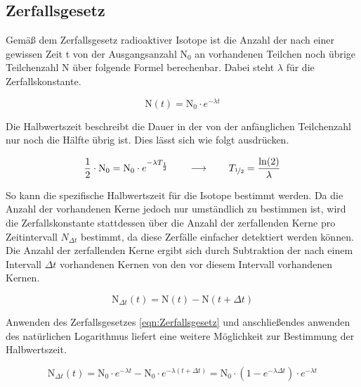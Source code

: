 \documentclass[titlepage = firstcover]{scrartcl}
\begin{document}
        \subsection{Zerfallsgesetz}
            Gemäß dem Zerfallsgesetz radioaktiver Isotope ist die Anzahl der nach einer gewissen Zeit t von der Ausgangsanzahl $\text{N}_0$ an vorhandenen Teilchen noch übrige Teilchenzahl N
            über folgende Formel berechenbar. Dabei steht $\lambda$ für die Zerfallskonstante.
            
            \begin{equation}
                \text{N}(t) = \text{N}_0 \cdot e^{-\lambda t}
                \label{eqn:Zerfallsgesetz}
            \end{equation}

            \noindent
            Die Halbwertszeit beschreibt die Dauer in der von der anfänglichen Teilchenzahl nur noch die Hälfte übrig ist. Dies lässt sich wie folgt ausdrücken.

            \begin{equation}
                \frac{1}{2} \cdot \text{N}_0 = \text{N}_0 \cdot e^{-\lambda T_{\frac{1}{2}}} \qquad \longrightarrow \qquad T_{\nicefrac{1}{2}} = \frac{\ln(2)}{\lambda}
                \label{eqn:Halbwertszeit}
            \end{equation}

            \noindent
            So kann die spezifische Halbwertszeit für die Isotope bestimmt werden.
            Da die Anzahl der vorhandenen Kerne jedoch nur umständlich zu bestimmen ist, wird die Zerfallskonstante stattdessen über die Anzahl der zerfallenden Kerne pro Zeitintervall $N_{\Delta t}$
            bestimmt, da diese Zerfälle einfacher detektiert werden können. Die Anzahl der zerfallenden Kerne ergibt sich durch Subtraktion der nach einem Intervall $\Delta t$ vorhandenen Kernen von
            den vor diesem Intervall vorhandenen Kernen.

            \begin{equation*}
                \text{N}_{\Delta t}(t) = \text{N}(t) - \text{N}(t + \Delta t)
            \end{equation*}

            \noindent
            Anwenden des Zerfallsgesetzes \ref{eqn:Zerfallsgesetz} und anschließendes anwenden des natürlichen Logarithmus liefert eine weitere Möglichkeit zur Bestimmung der Halbwertszeit.
            
            \begin{equation}
                \text{N}_{\Delta t}(t) = \text{N}_0 \cdot e^{-\lambda t} - \text{N}_0 \cdot e^{-\lambda (t + \Delta t)} = \text{N}_0 \cdot \left(1 - e^{-\lambda \Delta t}\right) \cdot e^{-\lambda t}
                \label{eqn:Zerfallsgesetz_}
            \end{equation}
                
\end{document}
